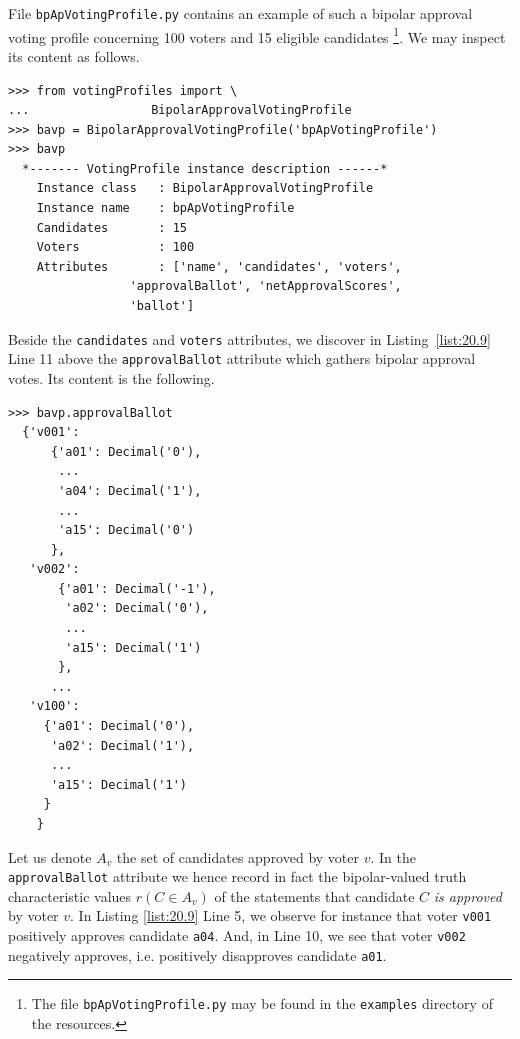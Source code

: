 File \texttt{bpApVotingProfile.py} contains an example of such a bipolar approval voting profile concerning 100 voters and 15 eligible candidates \footnote{The file \texttt{bpApVotingProfile.py} may be found in the \texttt{examples} directory of the \Digraph resources.}. We may inspect its content as follows.
\begin{lstlisting}[caption={Bipolar approval vonting profiles},label=list:20.9]
>>> from votingProfiles import \
...                 BipolarApprovalVotingProfile
>>> bavp = BipolarApprovalVotingProfile('bpApVotingProfile')
>>> bavp
  *------- VotingProfile instance description ------*
    Instance class   : BipolarApprovalVotingProfile
    Instance name    : bpApVotingProfile
    Candidates       : 15
    Voters           : 100
    Attributes       : ['name', 'candidates', 'voters',
                 'approvalBallot', 'netApprovalScores',
                 'ballot']
\end{lstlisting}
Beside the \texttt{candidates} and \texttt{voters} attributes, we discover in Listing~\ref{list:20.9} Line 11 above the \texttt{approvalBallot} attribute which gathers bipolar approval votes. Its content is the following.
\begin{lstlisting}[caption={Inspecting a bipolar approval ballot},label=list:20.9]
>>> bavp.approvalBallot
  {'v001':
      {'a01': Decimal('0'),
       ...
       'a04': Decimal('1'),
       ...
       'a15': Decimal('0')
      },
   'v002':
       {'a01': Decimal('-1'),
        'a02': Decimal('0'),
        ...
        'a15': Decimal('1')
       },
      ...
   'v100':
     {'a01': Decimal('0'),
      'a02': Decimal('1'),
      ...
      'a15': Decimal('1')
     }
    }
\end{lstlisting}	
Let us denote $A_v$ the set of candidates approved by voter $v$. In the \texttt{approvalBallot} attribute we hence record in fact the bipolar-valued truth characteristic values $r(C \in A_v)$ of the statements that candidate $C$ \emph{is approved} by voter $v$. In Listing \ref{list:20.9} Line 5, we observe for instance that voter \texttt{v001} positively approves candidate \texttt{a04}. And, in Line 10, we see that voter \texttt{v002} negatively approves, i.e. positively disapproves candidate \texttt{a01}.

